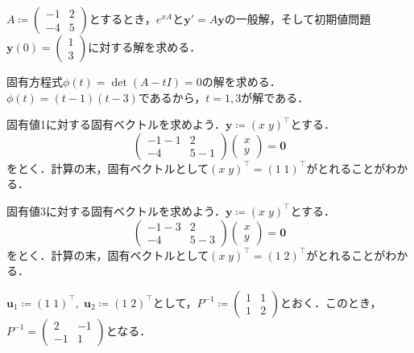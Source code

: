 \begin{example}
    $A \coloneqq \begin{pmatrix} -1 & 2 \\ -4 & 5 \end{pmatrix}$とするとき，$e^{xA}$と$\bm{y}'=A\bm{y}$の一般解，そして初期値問題$\bm{y}(0)=\begin{pmatrix} 1 \\ 3 \end{pmatrix}$に対する解を求める．

    固有方程式$\phi(t)=\det (A-tI)=0$の解を求める．$\phi(t)=(t-1)(t-3)$であるから，$t=1,3$が解である．

    固有値1に対する固有ベクトルを求めよう．$\bm{y} \coloneqq (x\; y)^\top$とする．
    \[ \begin{pmatrix}
        -1-1 & 2 \\
        -4 & 5-1
    \end{pmatrix}
    \begin{pmatrix}
        x \\ y
    \end{pmatrix}
    =\bm{0}\]
    をとく．計算の末，固有ベクトルとして$(x\; y)^\top=(1 \; 1)^\top$がとれることがわかる．

    固有値3に対する固有ベクトルを求めよう．$\bm{y} \coloneqq (x\; y)^\top$とする．
    \[ \begin{pmatrix}
        -1-3 & 2 \\
        -4 & 5-3
    \end{pmatrix}
    \begin{pmatrix}
        x \\ y
    \end{pmatrix}
    =\bm{0}\]
    をとく．計算の末，固有ベクトルとして$(x\; y)^\top=(1 \; 2)^\top$がとれることがわかる．

    $\bm{u}_1 \coloneqq (1\; 1)^\top, \; \bm{u}_2 \coloneqq (1\; 2)^\top$として，$P^{-1} \coloneqq \begin{pmatrix} 1 & 1 \\ 1 & 2\end{pmatrix}$とおく．このとき，$P^{-1}=\begin{pmatrix} 2 & -1 \\ -1 & 1 \end{pmatrix}$となる．


\end{example}
